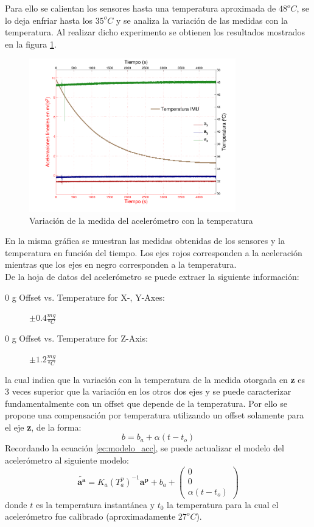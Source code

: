 \documentclass[main]{subfiles}
\begin{document}
Para ello se calientan los sensores hasta una temperatura aproximada de $48^oC$, se lo deja enfriar hasta los $35^oC$ y se analiza la variación de las medidas con la temperatura. Al realizar dicho experimento se obtienen los resultados mostrados en la figura \ref{fig:bajada}.

\begin{figure}[H]
  \begin{center}
    \includegraphics[width=0.8\textwidth]{./pics_acc/bajada.pdf}
  \end{center}
  \vspace{-20pt}
  \caption{Variación de la medida del acelerómetro con la temperatura }
  \label{fig:bajada}
\end{figure}

En la misma gráfica se muestran las medidas obtenidas de los sensores y la temperatura en función del tiempo. Los ejes rojos corresponden a la aceleración mientras que los ejes en negro corresponden a la temperatura.\\

De la hoja de datos del acelerómetro se puede extraer la siguiente información:
\begin{description}
\item [0 g Offset vs. Temperature for X-, Y-Axes:]$\pm 0.4\frac{mg}{^oC}$
\item [0 g Offset vs. Temperature for Z-Axis:]$\pm 1.2\frac{mg}{^oC}$
\end{description}
la cual indica que la variación con la temperatura de la medida otorgada en \textbf{z} es 3 veces superior que la variación en los otros dos ejes y se puede caracterizar fundamentalmente con un offset que depende de la temperatura. Por ello se propone una compensación por temperatura utilizando un offset solamente para el eje \textbf{z}, de la forma:
$$ b = b_a + \alpha (t - t_o) $$
Recordando la ecuación \ref{ec:modelo_acc}, se puede actualizar el modelo del acelerómetro al siguiente modelo:
\begin{equation}
\tilde{\mathbf{a^a}}=K_a(T_a^p)^{-1}\mathbf{a^p}+b_a+\left(
\begin{array}{c}
0 \\ 0 \\ \alpha(t - t_o)
\end{array}
\right)
\end{equation}
donde $t$ es la temperatura instantánea y $t_0$ la temperatura para la cual el acelerómetro fue calibrado (aproximadamente $27^oC$).\\
\end{document}
